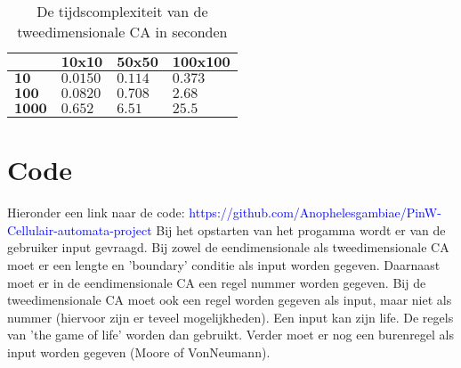 \documentclass[12pt,a4paper]{article}
\begin{document}
\begin{table*}
    \centering
    \begin{tabular}{|m{1.2cm}|m{2.0cm}|m{2.0cm}|m{2.0cm}|}
        \hline
        $\phantom{.}$ & $\textbf{10x10}$ & $\textbf{50x50}$ & $\textbf{100x100}$ \\
        \hline
        $\textbf{10}$ & $0.0150$ & $0.114$ & $0.373$ \\
        \hline
        $\textbf{100}$ & $0.0820$ & $0.708$ & $2.68$ \\
        \hline
        $\textbf{1000}$ & $0.652$ & $6.51$ & $25.5$ \\
        \hline
    \end{tabular}
    \caption{De tijdscomplexiteit van de tweedimensionale CA in seconden}
    \label{tbl:2dim}
\end{table*}

\section*{Code}
Hieronder een link naar de code: 
\textcolor{blue}{https://github.com/Anophelesgambiae/PinW-Cellulair-automata-project}
\newline
Bij het opstarten van het progamma wordt er van de gebruiker input gevraagd.
\newline
Bij zowel de eendimensionale als tweedimensionale CA moet 
er een lengte en 'boundary' conditie als input worden gegeven.
Daarnaast moet er in de eendimensionale CA een regel nummer worden gegeven.
Bij de tweedimensionale CA moet ook een regel worden gegeven als input, maar niet als nummer (hiervoor zijn er teveel mogelijkheden).
Een input kan zijn life. De regels van 'the game of life' worden dan gebruikt.
Verder moet er nog een burenregel als input worden gegeven (Moore of VonNeumann).
\end{document}
